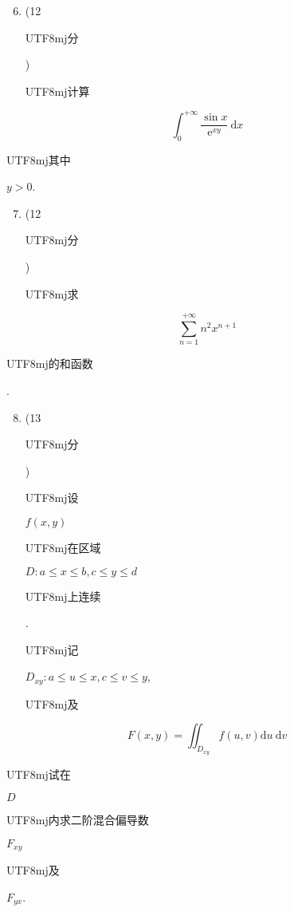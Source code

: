 \documentclass[10pt]{article}
\begin{document}
\begin{enumerate}
  \setcounter{enumi}{5}
  \item (12 \begin{CJK}{UTF8}{mj}分\end{CJK}) \begin{CJK}{UTF8}{mj}计算\end{CJK}
\end{enumerate}
$$
\int_{0}^{+\infty} \frac{\sin x}{\mathrm{e}^{x y}} \mathrm{~d} x
$$
\begin{CJK}{UTF8}{mj}其中\end{CJK} $y>0$.

\begin{enumerate}
  \setcounter{enumi}{6}
  \item (12 \begin{CJK}{UTF8}{mj}分\end{CJK}) \begin{CJK}{UTF8}{mj}求\end{CJK}
\end{enumerate}
$$
\sum_{n=1}^{+\infty} n^{2} x^{n+1}
$$
\begin{CJK}{UTF8}{mj}的和函数\end{CJK}.

\begin{enumerate}
  \setcounter{enumi}{7}
  \item (13 \begin{CJK}{UTF8}{mj}分\end{CJK}) \begin{CJK}{UTF8}{mj}设\end{CJK} $f(x, y)$ \begin{CJK}{UTF8}{mj}在区域\end{CJK} $D: a \leq x \leq b, c \leq y \leq d$ \begin{CJK}{UTF8}{mj}上连续\end{CJK}. \begin{CJK}{UTF8}{mj}记\end{CJK} $D_{x y}: a \leq u \leq x, c \leq v \leq y$, \begin{CJK}{UTF8}{mj}及\end{CJK}
\end{enumerate}
$$
F(x, y)=\iint_{D_{x y}} f(u, v) \mathrm{d} u \mathrm{~d} v
$$
\begin{CJK}{UTF8}{mj}试在\end{CJK} $D$ \begin{CJK}{UTF8}{mj}内求二阶混合偏导数\end{CJK} $F_{x y}$ \begin{CJK}{UTF8}{mj}及\end{CJK} $F_{y x}$.
\end{document}
